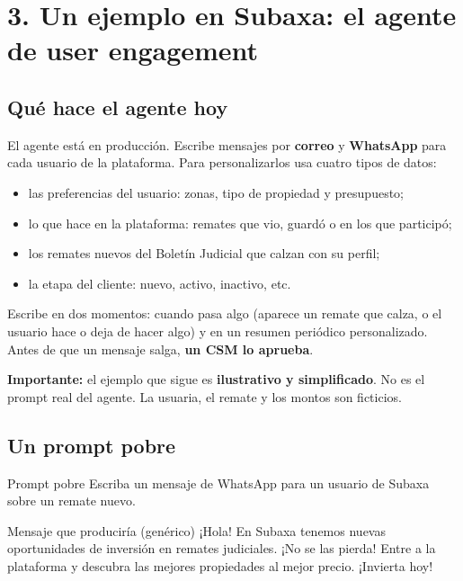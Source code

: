 \documentclass[11pt,letterpaper]{article}
\begin{document}
\section*{3. Un ejemplo en Subaxa: el agente de user engagement}

\subsection*{Qué hace el agente hoy}

El agente está en producción. Escribe mensajes por \textbf{correo} y
\textbf{WhatsApp} para cada usuario de la plataforma. Para personalizarlos
usa cuatro tipos de datos:

\begin{itemize}
\item las preferencias del usuario: zonas, tipo de propiedad y presupuesto;
\item lo que hace en la plataforma: remates que vio, guardó o en los que
  participó;
\item los remates nuevos del Boletín Judicial que calzan con su perfil;
\item la etapa del cliente: nuevo, activo, inactivo, etc.
\end{itemize}

Escribe en dos momentos: cuando pasa algo (aparece un remate que calza, o el
usuario hace o deja de hacer algo) y en un resumen periódico personalizado.
Antes de que un mensaje salga, \textbf{un CSM lo aprueba}.

\begin{aviso}
\small\textbf{Importante:} el ejemplo que sigue es \textbf{ilustrativo y
simplificado}. No es el prompt real del agente. La usuaria, el remate y los
montos son ficticios.
\end{aviso}

\subsection*{Un prompt pobre}

\begin{prompt}{Prompt pobre}
\small Escriba un mensaje de WhatsApp para un usuario de Subaxa sobre un
remate nuevo.
\end{prompt}

\begin{mensaje}{Mensaje que produciría (genérico)}
\small ¡Hola! En Subaxa tenemos nuevas oportunidades de inversión en remates
judiciales. ¡No se las pierda! Entre a la plataforma y descubra las mejores
propiedades al mejor precio. ¡Invierta hoy!
\end{mensaje}
\end{document}
